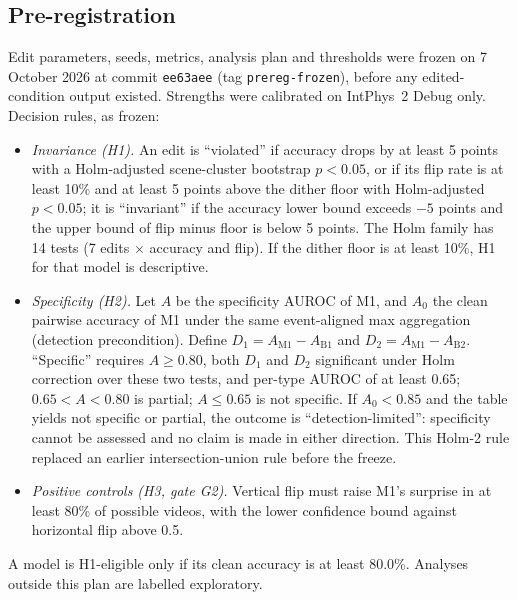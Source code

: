 \subsection{Pre-registration}
Edit parameters, seeds, metrics, analysis plan and thresholds were frozen on 7 October 2026 at commit \texttt{ee63aee} (tag \texttt{prereg-frozen}), before any edited-condition output existed. Strengths were calibrated on IntPhys~2 Debug only. Decision rules, as frozen:
\begin{itemize}
\item \emph{Invariance (H1).} An edit is ``violated'' if accuracy drops by at least 5 points with a Holm-adjusted scene-cluster bootstrap $p<0.05$, or if its flip rate is at least 10\% and at least 5 points above the dither floor with Holm-adjusted $p<0.05$; it is ``invariant'' if the accuracy lower bound exceeds $-5$ points and the upper bound of flip minus floor is below 5 points. The Holm family has 14 tests (7 edits $\times$ accuracy and flip). If the dither floor is at least 10\%, H1 for that model is descriptive.
\item \emph{Specificity (H2).} Let $A$ be the specificity AUROC of M1, and $A_0$ the clean pairwise accuracy of M1 under the same event-aligned max aggregation (detection precondition). Define $D_1=A_{\mathrm{M1}}-A_{\mathrm{B1}}$ and $D_2=A_{\mathrm{M1}}-A_{\mathrm{B2}}$. ``Specific'' requires $A\ge0.80$, both $D_1$ and $D_2$ significant under Holm correction over these two tests, and per-type AUROC of at least 0.65; $0.65<A<0.80$ is partial; $A\le0.65$ is not specific. If $A_0<0.85$ and the table yields not specific or partial, the outcome is ``detection-limited'': specificity cannot be assessed and no claim is made in either direction. This Holm-2 rule replaced an earlier intersection-union rule before the freeze.
\item \emph{Positive controls (H3, gate G2).} Vertical flip must raise M1's surprise in at least 80\% of possible videos, with the lower confidence bound against horizontal flip above 0.5.
\end{itemize}
A model is H1-eligible only if its clean accuracy is at least 80.0\%. Analyses outside this plan are labelled exploratory.

